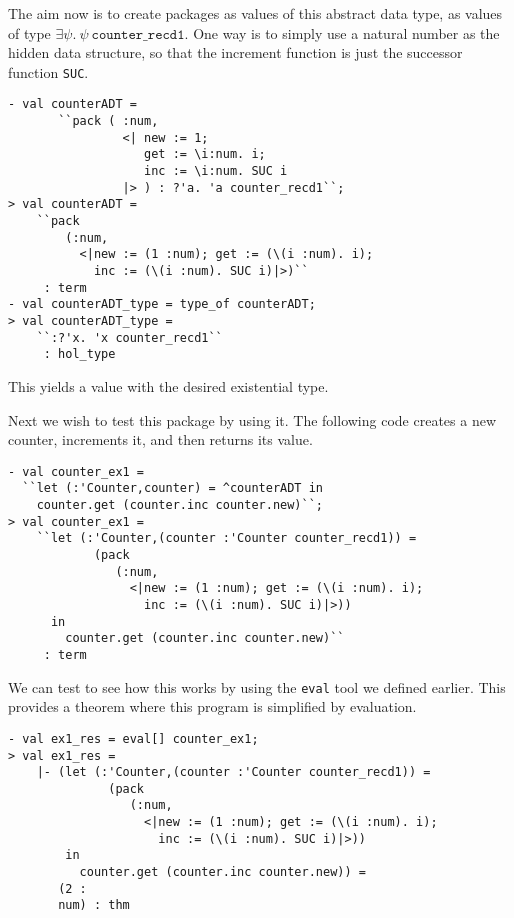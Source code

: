 The aim now is to create packages as values of this abstract data type,
as values of type $\exists\psi.\ \psi\ \mathtt{counter\_recd1}$.
One way is to simply use a natural number as the hidden data
structure, so that the increment function is just the successor function {\tt SUC}.
\begin{session}
\begin{verbatim}
- val counterADT =
       ``pack ( :num,
                <| new := 1;
                   get := \i:num. i;
                   inc := \i:num. SUC i
                |> ) : ?'a. 'a counter_recd1``;
> val counterADT =
    ``pack
        (:num,
          <|new := (1 :num); get := (\(i :num). i);
            inc := (\(i :num). SUC i)|>)``
     : term
- val counterADT_type = type_of counterADT;
> val counterADT_type =
    ``:?'x. 'x counter_recd1``
     : hol_type
\end{verbatim}
\end{session}
This yields a value with the desired existential type.

Next we wish to test this package by using it. The following
code creates a new counter, increments it, and then returns its value.
\begin{session}
\begin{verbatim}
- val counter_ex1 =
  ``let (:'Counter,counter) = ^counterADT in
    counter.get (counter.inc counter.new)``;
> val counter_ex1 =
    ``let (:'Counter,(counter :'Counter counter_recd1)) =
            (pack
               (:num,
                 <|new := (1 :num); get := (\(i :num). i);
                   inc := (\(i :num). SUC i)|>))
      in
        counter.get (counter.inc counter.new)``
     : term
\end{verbatim}
\end{session}

We can test to see how this works by using the {\tt eval} tool we
defined earlier. This provides a theorem where this program is
simplified by evaluation.
\begin{session}
\begin{verbatim}
- val ex1_res = eval[] counter_ex1;
> val ex1_res =
    |- (let (:'Counter,(counter :'Counter counter_recd1)) =
              (pack
                 (:num,
                   <|new := (1 :num); get := (\(i :num). i);
                     inc := (\(i :num). SUC i)|>))
        in
          counter.get (counter.inc counter.new)) =
       (2 :
       num) : thm
\end{verbatim}
\end{session}

